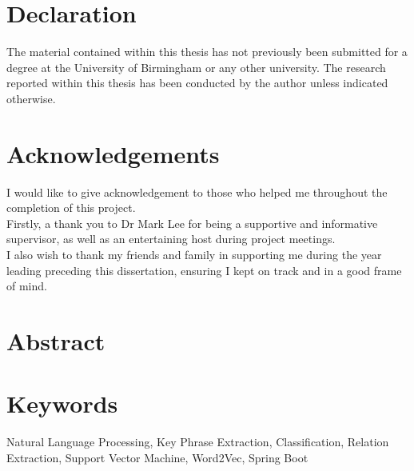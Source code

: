 \documentclass{article}
\begin{document}

\section*{Declaration}
The material contained within this thesis has not previously been submitted for a degree at the University of Birmingham or any other university. The research reported within this thesis has been conducted by the author unless indicated otherwise.

\pagebreak

\section*{Acknowledgements}
I would like to give acknowledgement to those who helped me throughout the completion of this project.\\

Firstly, a thank you to Dr Mark Lee for being a supportive and informative supervisor, as well as an entertaining host during project meetings. \\

I also wish to thank my friends and family in supporting me during the year leading preceding this dissertation, ensuring I kept on track and in a good frame of mind.\\

\pagebreak

\section*{Abstract}

\section*{Keywords}
Natural Language Processing, Key Phrase Extraction, Classification, Relation Extraction, Support Vector Machine, Word2Vec, Spring Boot

\pagebreak

\tableofcontents
\listoffigures
\listoftables
{}
\pagebreak












\pagebreak

\nocite{*}

\end{document}
